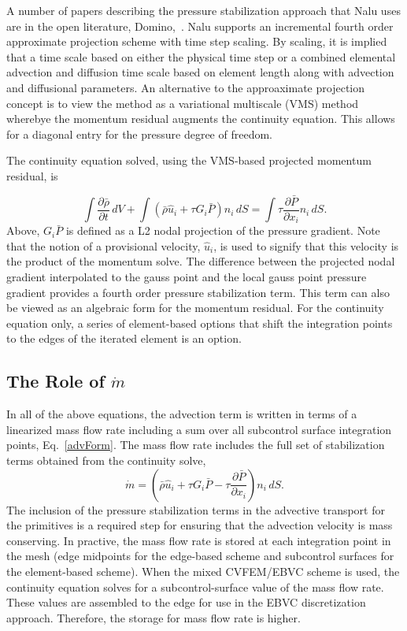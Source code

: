 A number of papers describing the pressure stabilization approach that Nalu uses are in the open literature,
Domino,~\cite{Domino:2006, Domino:2008, Domino:2014}.  Nalu supports an incremental
fourth order approximate projection scheme with time step 
scaling. By scaling, it is implied that a time scale based on either the physical time step or 
a combined elemental advection and diffusion time scale based on element length along
with advection and diffusional parameters. An alternative to the approaximate projection
concept is to view the method as a variational multiscale (VMS) method wherebye the momentum residual
augments the continuity equation. This allows for a diagonal entry for the pressure degree of freedom.

The continuity equation solved, using the VMS-based projected momentum residual, is

\begin{equation}
\int \frac{\partial \bar{\rho}} {\partial t}\, dV
+ \int \left( \bar{\rho} \hat{u}_i + \tau G_i \bar{P} \right) n_i\, dS
  = \int \tau \frac{\partial \bar{P}}{\partial x_i} n_i\, dS.
\end{equation}
%
Above, $G_i \bar{P}$ is defined as a L2 nodal projection of the pressure gradient. Note that the notion of 
a provisional velocity, $\hat u_i$, is used to signify that this velocity is the product of the momentum 
solve. The difference between the projected nodal gradient interpolated to the gauss point and the 
local gauss point pressure gradient provides a fourth order pressure stabilization
term. This term can also be viewed as an algebraic form for the momentum residual. For the continuity
equation only, a series of element-based options that shift the integration points to the edges of the 
iterated element is an option.

\subsection{The Role of $\dot m$}

In all of the above equations, the advection term is written in terms of a linearized 
mass flow rate including a sum over all subcontrol surface integration points,
Eq.~\ref{advForm}. The mass flow rate includes the full set of stabilization terms
obtained from the continuity solve,
\begin{equation}
\dot m = \left(\bar{\rho} \hat{u}_i + \tau G_i \bar{P} 
  -\tau \frac{\partial \bar{P}}{\partial x_i}\right) n_i\, dS.
\end{equation}
The inclusion of the pressure stabilization terms in the advective
transport for the primitives is a required step for ensuring that
the advection velocity is mass conserving. In practive, the mass flow
rate is stored at each integration point in the mesh (edge midpoints for the
edge-based scheme and subcontrol surfaces for the element-based scheme).
When the mixed CVFEM/EBVC scheme is used, the continuity equation solves for
a subcontrol-surface value of the mass flow rate. These values are assembled to the
edge for use in the EBVC discretization approach. Therefore, the storage for mass
flow rate is higher.

